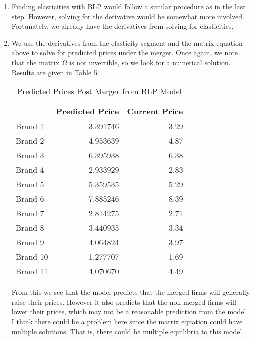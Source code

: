 \documentclass[10pt]{article}
\begin{document}
\begin{enumerate}
  \item Finding elasticities with BLP would follow a similar procedure as in the last step. However, solving for the derivative would be somewhat more involved. Fortunately, we already have the derivatives from solving for elasticities.

  \item We use the derivatives from the elasticity segment and the matrix equation above to solve for predicted prices under the merger. Once again, we note that the matrix $\Omega$ is not invertible, so we look for a numerical solution.  Results are given in Table 5.\\
  \begin{center}
  \begin{table}[!htb]
  \centering
  \begin{tabular}{lrr}
  \hline
  {} &  Predicted Price &  Current Price \\
  \hline
  Brand 1  &         3.391746 &           3.29 \\
  Brand 2  &         4.953639 &           4.87 \\
  Brand 3  &         6.395938 &           6.38 \\
  Brand 4  &         2.933929 &           2.83 \\
  Brand 5  &         5.359535 &           5.29 \\
  Brand 6  &         7.885246 &           8.39 \\
  Brand 7  &         2.814275 &           2.71 \\
  Brand 8  &         3.440935 &           3.34 \\
  Brand 9  &         4.064824 &           3.97 \\
  Brand 10 &         1.277707 &           1.69 \\
  Brand 11 &         4.070670 &           4.49 \\
  \hline
  \end{tabular}
\caption{Predicted Prices Post Merger from BLP Model}
\end{table}
\end{center}

From this we see that the model predicts that the merged firms will generally raise their prices. However it also predicts that the non merged firms will lower their prices, which may not be a reasonable prediction from the model. I think there could be a problem here since the matrix equation could have multiple solutions. That is, there could be multiple equilibria to this model.

\end{enumerate}
\end{document}
